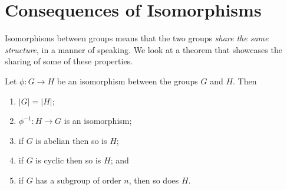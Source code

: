 \section{Consequences of Isomorphisms}
Isomorphisms between groups means that the two groups \textit{share the same structure}, in a manner of speaking. We look at a theorem that showcases the sharing of some of these properties.
\begin{theorem}\label{thrm-isomorphism-consequences}
    Let $\phi: G \to H$ be an isomorphism between the groups $G$ and $H$. Then
    \begin{enumerate}
        \item $|G| = |H|$;
        \item $\phi^{-1}: H \to G$ is an isomorphism;
        \item if $G$ is abelian then so is $H$;
        \item if $G$ is cyclic then so is $H$; and
        \item if $G$ has a subgroup of order $n$, then so does $H$.
    \end{enumerate}
\end{theorem}

